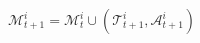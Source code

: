 \documentclass[preview]{standalone}
\begin{document}
\begin{align*}
\mathcal{M}_{t+1}^i = \mathcal{M}_t^i \cup (\mathscr{T}_{t+1}^i,\mathscr{A}_{t+1}^i)
\end{align*}
\end{document}
